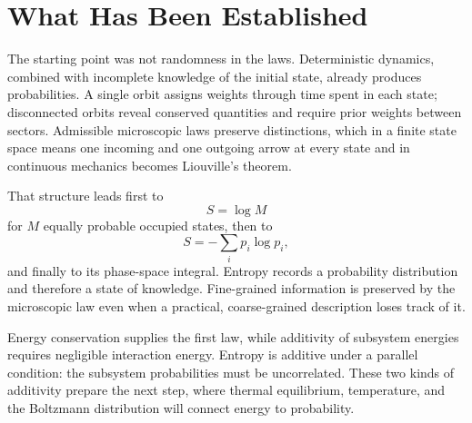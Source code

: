 \section{What Has Been Established}

The starting point was not randomness in the laws. Deterministic dynamics,
combined with incomplete knowledge of the initial state, already produces
probabilities. A single orbit assigns weights through time spent in each
state; disconnected orbits reveal conserved quantities and require prior
weights between sectors. Admissible microscopic laws preserve distinctions,
which in a finite state space means one incoming and one outgoing arrow at
every state and in continuous mechanics becomes Liouville's theorem.

That structure leads first to
\begin{equation}
 S=\log M
\end{equation}
for \(M\) equally probable occupied states, then to
\begin{equation}
 S=-\sum_i p_i\log p_i,
\end{equation}
and finally to its phase-space integral. Entropy records a probability
distribution and therefore a state of knowledge. Fine-grained information
is preserved by the microscopic law even when a practical, coarse-grained
description loses track of it.

Energy conservation supplies the first law, while additivity of subsystem
energies requires negligible interaction energy. Entropy is additive under
a parallel condition: the subsystem probabilities must be uncorrelated.
These two kinds of additivity prepare the next step, where thermal
equilibrium, temperature, and the Boltzmann distribution will connect energy
to probability.
